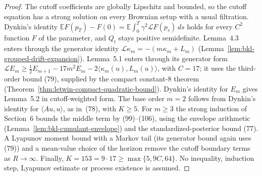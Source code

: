 \begin{proof}
  \leanok
  The cutoff coefficients are globally Lipschitz and bounded, so the cutoff equation has a strong solution on every
  Brownian setup with a usual filtration. Dynkin's identity $\mathbb EF(p_T)-F(0)=\mathbb E\int_0^T\gamma^2\mathcal
  LF(p_s)\,ds$ holds for every $C^2$ function $F$ of the parameter, and $Q_t$ stays positive semidefinite. Lemma~4.3
  enters through the generator identity $\mathcal L\kappa_m=-(m\kappa_m+L_m)$
  (Lemma~\ref{lem:bkl-grouped-drift-expansion}). Lemma~5.1 enters through its generator form
  $\mathcal LE_m\ge\frac12E_{m+1}-17m^2E_m-2\langle\kappa_m(u),L_m(u)\rangle$, with $C=17$; it uses the third-order bound
  (79), supplied by the compact constant-8 theorem (Theorem~\ref{thm:letwin-compact-quadratic-bound}).
  Dynkin's identity for $E_m$ gives Lemma~5.2 in cutoff-weighted form. The base order $m=2$ follows from Dynkin's
  identity for $\langle Au,u\rangle$, as in~(78), with $K\ge5$. For $m\ge3$ the strong induction of Section~6 bounds
  the middle term by (99)--(106), using the envelope arithmetic (Lemma~\ref{lem:bkl-cumulant-envelope}) and the
  standardized-posterior bound (77). A Lyapunov moment bound with a Markov tail (its generator bound again uses (79))
  and a mean-value choice of the horizon remove the cutoff boundary terms as $R\to\infty$. Finally,
  $K=153=9\cdot17\ge\max\{5,9C,64\}$. No inequality, induction step, Lyapunov estimate or process existence is
  assumed.
\end{proof}

